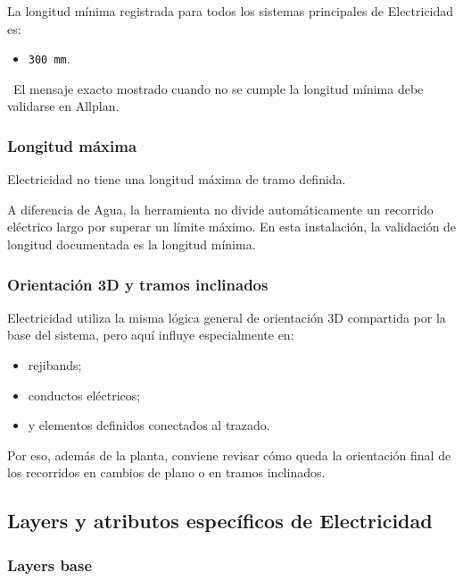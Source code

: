 La longitud mínima registrada para todos los sistemas principales de Electricidad es:

\begin{itemize}
\item \texttt{300 mm}.
\end{itemize}

\pendingtag\ El mensaje exacto mostrado cuando no se cumple la longitud mínima debe validarse en Allplan.

\subsubsection{Longitud máxima}

Electricidad no tiene una longitud máxima de tramo definida.

A diferencia de Agua, la herramienta no divide automáticamente un recorrido eléctrico largo por superar un límite máximo. En esta instalación, la validación de longitud documentada es la longitud mínima.

\subsubsection{Orientación 3D y tramos inclinados}

Electricidad utiliza la misma lógica general de orientación 3D compartida por la base del sistema, pero aquí influye especialmente en:

\begin{itemize}
\item rejibands;
\item conductos eléctricos;
\item y elementos definidos conectados al trazado.
\end{itemize}

Por eso, además de la planta, conviene revisar cómo queda la orientación final de los recorridos en cambios de plano o en tramos inclinados.


\subsection{Layers y atributos específicos de Electricidad}

\subsubsection{Layers base}

